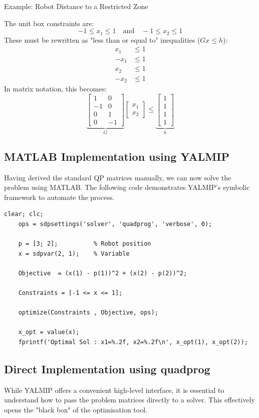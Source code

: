 \begin{examplebox}{Example: Robot Distance to a Restricted Zone}
	
	The unit box constraints are:
	\[
	-1 \leq x_1 \leq 1 \quad \text{and} \quad -1 \leq x_2 \leq 1
	\]
	These must be rewritten as "less than or equal to" inequalities ($Gx \leq h$):
	\begin{align*}
		x_1 &\leq 1 \\
		-x_1 &\leq 1 \\
		x_2 &\leq 1 \\
		-x_2 &\leq 1 
	\end{align*}
	In matrix notation, this becomes:
	\[
	\underbrace{\begin{bmatrix} 
			1 &  0 \\
			-1 &  0 \\
			0 &  1 \\
			0 & -1 
	\end{bmatrix}}_{G} 
	\begin{bmatrix} x_1 \\ x_2 \end{bmatrix} 
	\leq 
	\underbrace{\begin{bmatrix} 
			1 \\ 1 \\ 1 \\ 1 
	\end{bmatrix}}_{h}
	\]	

\subsection*{MATLAB Implementation using YALMIP}
Having derived the standard QP matrices manually, we can now solve the problem using MATLAB. The following code demonstrates YALMIP's symbolic framework to automate the process.

\begin{lstlisting}[caption={Solving the Robot Trajectory QP using YALMIP and quadprog.}, label={lst:yalmip_qp}]
	clear; clc;
	ops = sdpsettings('solver', 'quadprog', 'verbose', 0);
	
	p = [3; 2];          % Robot position
	x = sdpvar(2, 1);    % Variable
	
	Objective  = (x(1) - p(1))^2 + (x(2) - p(2))^2;
	
	Constraints = [-1 <= x <= 1];
	
	optimize(Constraints , Objective, ops);
	
	x_opt = value(x);
	fprintf('Optimal Sol : x1=%.2f, x2=%.2f\n', x_opt(1), x_opt(2));
\end{lstlisting}	

\subsection*{Direct Implementation using quadprog}
While YALMIP offers a convenient high-level interface, it is essential to understand how to pass the problem matrices directly to a solver. This effectively opens the "black box" of the optimisation tool.


\end{examplebox}
